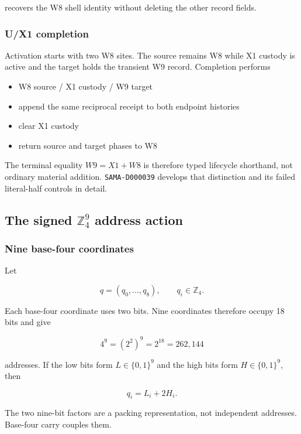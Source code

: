 recovers the W8 shell identity without deleting the other record fields.

\subsubsection{U/X1 completion}\label{viii-ch04-ux1-completion}

Activation starts with two W8 sites. The source remains W8 while X1
custody is active and the target holds the transient W9 record.
Completion performs

\begin{itemize}
\tightlist
\item
  W8 source / X1 custody / W9 target
\item
  append the same reciprocal receipt to both endpoint histories
\item
  clear X1 custody
\item
  return source and target phases to W8
\end{itemize}

The terminal equality \(W9=X1+W8\) is therefore typed lifecycle
shorthand, not ordinary material addition. \texttt{SAMA-D000039}
develops that distinction and its failed literal-half controls in
detail.

\subsection{\texorpdfstring{The signed \(\mathbb Z_4^9\) address
action}{The signed \textbackslash mathbb Z\_4\^{}9 address action}}\label{viii-ch04-the-signed-mathbb-z_49-address-action}

\subsubsection{Nine base-four
coordinates}\label{viii-ch04-nine-base-four-coordinates}

Let

\[
q=(q_0,\ldots,q_8),\qquad q_i\in\mathbb Z_4.
\]

Each base-four coordinate uses two bits. Nine coordinates therefore
occupy 18 bits and give

\[
4^9=(2^2)^9=2^{18}=262{,}144
\]

addresses. If the low bits form \(L\in\{0,1\}^9\) and the high bits form
\(H\in\{0,1\}^9\), then

\[
q_i=L_i+2H_i.
\]

The two nine-bit factors are a packing representation, not independent
addresses. Base-four carry couples them.


